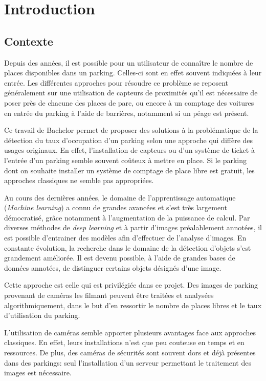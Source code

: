 \chapter{Introduction}

\section{Contexte} \label{intro.contexte}
Depuis des années, il est possible pour un utilisateur de connaître le nombre de places disponibles dans un parking. Celles-ci sont en effet souvent indiquées à leur entrée. Les différentes approches pour résoudre ce problème se reposent généralement sur une utilisation de capteurs de proximités qu'il est nécessaire de poser près de chacune des places de parc, ou encore à un comptage des voitures en entrée du parking à l'aide de barrières, notamment si un péage est présent.

Ce travail de Bachelor permet de proposer des solutions à la problématique de la détection du taux d'occupation d'un parking selon une approche qui diffère des usages originaux. En effet, l'installation de capteurs ou d'un système de ticket à l'entrée d'un parking semble souvent coûteux à mettre en place. Si le parking dont on souhaite installer un système de comptage de place libre est gratuit, les approches classiques ne semble pas appropriées.

Au cours des dernières années, le domaine de l'apprentissage automatique (\textit{Machine learning}) a connu de grandes avancées et s'est très largement démocratisé, grâce notamment à l'augmentation de la puissance de calcul. Par diverses méthodes de \textit{deep learning} et à partir d'images préalablement annotées, il est possible d'entrainer des modèles afin d'effectuer de l'analyse d'images. En constante évolution, la recherche dans le domaine de la détection d'objets s'est grandement améliorée. Il est devenu possible, à l'aide de grandes bases de données annotées, de distinguer certains objets désignés d'une image. 

Cette approche est celle qui est privilégiée dans ce projet. Des images de parking provenant de caméras les filmant peuvent être traitées et analysées algorithmiquement, dans le but d'en ressortir le nombre de places libres et le taux d'utilisation du parking. 

L'utilisation de caméras semble apporter plusieurs avantages face aux approches classiques. En effet, leurs installations n'est que peu couteuse en temps et en ressources. De plus, des caméras de sécurités sont souvent dors et déjà présentes dans des parkings: seul l'installation d'un serveur permettant le traitement des images est nécessaire. 

